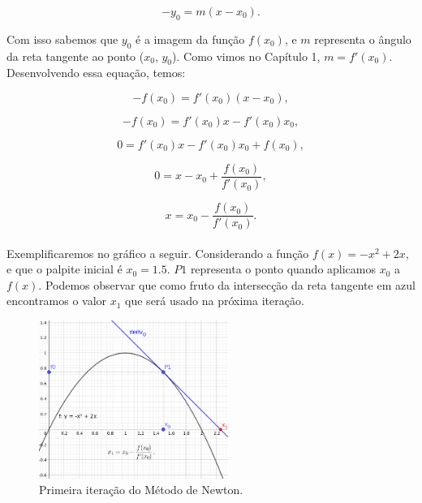 \begin{equation}
    -y_0=m(x-x_0).
\end{equation}

Com isso sabemos que $y_0$ é a imagem da função $f(x_0)$, e $m$ representa o
ângulo da reta tangente ao ponto ($x_0$, $y_0$). Como vimos no Capítulo 1,
 $m=f'(x_0)$. Desenvolvendo essa equação, temos:

\begin{equation}
    -f(x_0) = f'(x_0)(x-x_0),
\end{equation}

\begin{equation}
    -f(x_0) = f'(x_0)x - f'(x_0)x_0,
\end{equation}

\begin{equation}
    0 = f'(x_0)x - f'(x_0)x_0+f(x_0),
\end{equation}

\begin{equation}
    0 = x - x_0 + \frac{f(x_0)}{f'(x_0)},
\end{equation}

\begin{equation}
    x = x_0 - \frac {f(x_0)}{f'(x_0)}.
\end{equation}\\

Exemplificaremos no gráfico a seguir. Considerando a função $f(x)=-x^2+2x$, e
que o palpite inicial é $x_0=1.5$. $P1$ representa o ponto quando aplicamos
$x_0$ a $f(x)$. Podemos observar que como fruto da intersecção da reta tangente
em azul encontramos o valor $x_1$ que será usado na próxima iteração.

\begin{figure}[ht]
    \includegraphics[width=0.55\textwidth]
      {src/MetodoNewton_grafico_1.png}
    \centering
    \caption{
      Primeira iteração do Método de Newton.
     }
    \label{MetodoNewton_grafico_1}
\end{figure}


